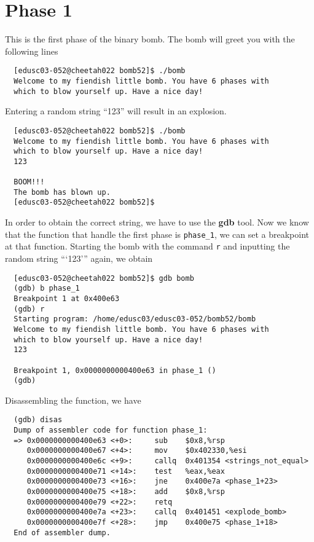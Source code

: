 \section{Phase 1}
This is the first phase of the binary bomb. The bomb will greet you with the following lines
\begin{verbatim}
  [edusc03-052@cheetah022 bomb52]$ ./bomb
  Welcome to my fiendish little bomb. You have 6 phases with
  which to blow yourself up. Have a nice day!
\end{verbatim}
Entering a random string ``123'' will result in an explosion.
\begin{verbatim}
  [edusc03-052@cheetah022 bomb52]$ ./bomb
  Welcome to my fiendish little bomb. You have 6 phases with
  which to blow yourself up. Have a nice day!
  123

  BOOM!!!
  The bomb has blown up.
  [edusc03-052@cheetah022 bomb52]$
\end{verbatim}
In order to obtain the correct string, we have to use the \textbf{gdb} tool. Now we know that the function that handle the first phase is \verb+phase_1+, we can set a breakpoint at that function. Starting the bomb with the command \verb+r+ and inputting the random string ```123''' again, we obtain
\begin{verbatim}
  [edusc03-052@cheetah022 bomb52]$ gdb bomb
  (gdb) b phase_1
  Breakpoint 1 at 0x400e63
  (gdb) r
  Starting program: /home/edusc03/edusc03-052/bomb52/bomb
  Welcome to my fiendish little bomb. You have 6 phases with
  which to blow yourself up. Have a nice day!
  123

  Breakpoint 1, 0x0000000000400e63 in phase_1 ()
  (gdb)
\end{verbatim}
Disassembling the function, we have
\begin{verbatim}
  (gdb) disas
  Dump of assembler code for function phase_1:
  => 0x0000000000400e63 <+0>:     sub    $0x8,%rsp
     0x0000000000400e67 <+4>:     mov    $0x402330,%esi
     0x0000000000400e6c <+9>:     callq  0x401354 <strings_not_equal>
     0x0000000000400e71 <+14>:    test   %eax,%eax
     0x0000000000400e73 <+16>:    jne    0x400e7a <phase_1+23>
     0x0000000000400e75 <+18>:    add    $0x8,%rsp
     0x0000000000400e79 <+22>:    retq
     0x0000000000400e7a <+23>:    callq  0x401451 <explode_bomb>
     0x0000000000400e7f <+28>:    jmp    0x400e75 <phase_1+18>
  End of assembler dump.
\end{verbatim}
